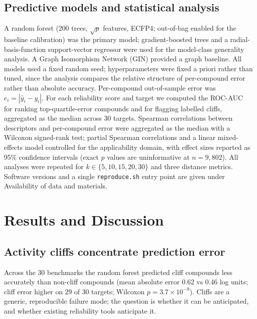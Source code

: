 \documentclass[11pt,letterpaper]{article}
\begin{document}
\subsection*{Predictive models and statistical analysis}
A random forest (200 trees, $\sqrt{p}$ features, ECFP4; out-of-bag enabled for the baseline calibration) was the primary model; gradient-boosted trees and a radial-basis-function support-vector regressor were used for the model-class generality analysis. A Graph Isomorphism Network (GIN) provided a graph baseline. All models used a fixed random seed; hyperparameters were fixed a priori rather than tuned, since the analysis compares the relative structure of per-compound error rather than absolute accuracy. Per-compound out-of-sample error was $e_i = |\hat{y}_i - y_i|$. For each reliability score and target we computed the ROC-AUC for ranking top-quartile-error compounds and for flagging labelled cliffs, aggregated as the median across 30 targets. Spearman correlations between descriptors and per-compound error were aggregated as the median with a Wilcoxon signed-rank test; partial Spearman correlations and a linear mixed-effects model controlled for the applicability domain, with effect sizes reported as 95\% confidence intervals (exact $p$ values are uninformative at $n = 9{,}802$). All analyses were repeated for $k \in \{5,10,15,20,30\}$ and three distance metrics. Software versions and a single \texttt{reproduce.sh} entry point are given under Availability of data and materials.

\section*{Results and Discussion}

\subsection*{Activity cliffs concentrate prediction error}
Across the 30 benchmarks the random forest predicted cliff compounds less accurately than non-cliff compounds (mean absolute error 0.62 vs 0.46 log units; cliff error higher on 29 of 30 targets; Wilcoxon $p = 3.7 \times 10^{-9}$). Cliffs are a generic, reproducible failure mode; the question is whether it can be anticipated, and whether existing reliability tools anticipate it.
\end{document}
